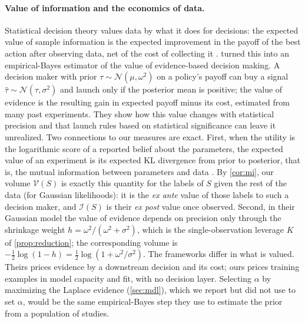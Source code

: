 \documentclass[10pt,twocolumn,letterpaper]{article}
\theoremstyle{definition}
\newcommand{\Vol}{\mathcal{V}}
\newcommand{\Inf}{\mathcal{I}}
\newcommand{\N}{\mathcal{N}}
\begin{document}
\paragraph{Value of information and the economics of data.} Statistical decision theory values data by what it does for decisions: the expected value of sample information is the expected improvement in the payoff of the best action after observing data, net of the cost of collecting it \citep{blackwell1951,raiffa1961,howard1966}. \citet{abadie2023} turned this into an empirical-Bayes estimator of the value of evidence-based decision making. A decision maker with prior $\tau\sim\N(\mu,\omega^2)$ on a policy's payoff can buy a signal $\hat\tau\sim\N(\tau,\sigma^2)$ and launch only if the posterior mean is positive; the value of evidence is the resulting gain in expected payoff minus its cost, estimated from many past experiments. They show how this value changes with statistical precision and that launch rules based on statistical significance can leave it unrealized. Two connections to our measures are exact. First, when the utility is the logarithmic score of a reported belief about the parameters, the expected value of an experiment is its expected KL divergence from prior to posterior, that is, the mutual information between parameters and data \citep{lindley1956,bernardo1979}. By \cref{cor:mi}, our volume $\Vol(S)$ is exactly this quantity for the labels of $S$ given the rest of the data (for Gaussian likelihoods): it is the \emph{ex ante} value of those labels to such a decision maker, and $\Inf(S)$ is their \emph{ex post} value once observed. Second, in their Gaussian model the value of evidence depends on precision only through the shrinkage weight $h=\omega^2/(\omega^2+\sigma^2)$, which is the single-observation leverage $K$ of \cref{prop:reduction}; the corresponding volume is $-\tfrac12\log(1-h)=\tfrac12\log(1+\omega^2/\sigma^2)$. The frameworks differ in what is valued. Theirs prices evidence by a downstream decision and its cost; ours prices training examples in model capacity and fit, with no decision layer. Selecting $\alpha$ by maximizing the Laplace evidence (\cref{sec:mdl}), which we report but did not use to set $\alpha$, would be the same empirical-Bayes step they use to estimate the prior from a population of studies.
\end{document}

